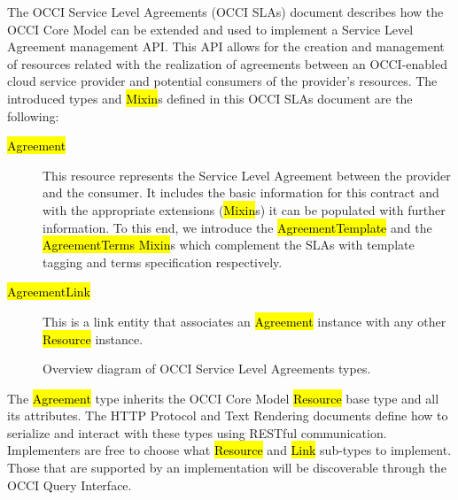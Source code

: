\documentclass[10pt,a4paper]{article}
\begin{document}
The OCCI Service Level Agreements (OCCI SLAs) document describes how the OCCI Core Model \cite{occi:core} can be extended and used to implement a Service Level Agreement management API. This API allows for the creation and management of resources related with the realization of agreements between an OCCI-enabled cloud service provider and potential consumers of the provider’s resources. The introduced types and \hl{Mixin}s defined in this OCCI SLAs document are the following:


\begin{description}
\item[\hl{Agreement }] This resource represents the Service Level Agreement between the provider and the consumer. It includes the basic information for this contract and with the appropriate extensions (\hl{Mixin}s) it can be populated with further information. To this end, we introduce the \hl{AgreementTemplate} and the \hl{AgreementTerms Mixin}s which complement the SLAs with template tagging and terms specification respectively.

\item[\hl{AgreementLink }] This is a link entity that associates an \hl{Agreement} instance with any other \hl{Resource} instance.
\end{description}


\begin{figure}[!h]
	{\centering {} \par}
	\caption{Overview diagram of OCCI Service Level Agreements types.}
	\label{fig:sla_uml}
\end{figure}

 The \hl{Agreement} type inherits the OCCI Core Model \hl{Resource}
base type and all its attributes. The HTTP Protocol \cite{occi:http_protocol} and Text
Rendering \cite{occi:text_rendering} documents define how to serialize and interact with
these types using RESTful communication. Implementers are free to
choose what \hl{Resource} and \hl{Link} sub-types to implement. Those
that are supported by an implementation will be discoverable through
the OCCI Query Interface.
\end{document}

